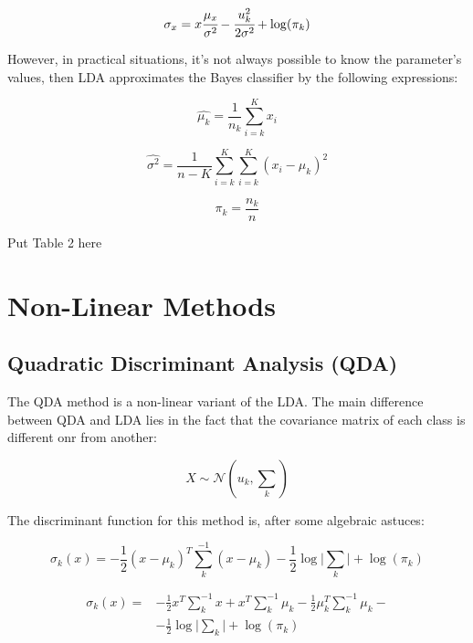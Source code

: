 \documentclass[conference]{IEEEtran}
\newcommand{\reviewUrgent}[1]{{\color{red} #1}} %
\begin{document}
\begin{equation}
    \sigma_x = x\cfrac{\mu_x}{\sigma^2} - \cfrac{u_k^2}{2\sigma^2} + \log(\pi_k) \label{eq9}
\end{equation}

However, in practical situations, it's not always possible to know the parameter's values,
then LDA approximates the Bayes classifier by the following expressions:

\begin{equation}
    \hat{\mu_k} = \frac{1}{n_k} \sum^K_{i = k} x_i \label{eq10}
\end{equation}

\begin{equation}
    \hat{\sigma^2} = \frac{1}{n-K} \sum^K_{i = k} \sum^K_{i = k} (x_i-\hat{\mu_k})^2 \label{eq11}
\end{equation}

\begin{equation}
    \pi_k = \frac{n_k}{n}\label{eq12}
\end{equation}


\reviewUrgent{Put Table 2 here}


\section{Non-Linear Methods}

\subsection{Quadratic Discriminant Analysis (QDA)}

The QDA method is a non-linear variant of the LDA. The main difference between QDA and LDA
lies in the fact that the covariance matrix of each class is different onr from another:

\begin{equation}
    X \sim  \mathcal{N}(u_k, \textstyle \sum_k)\label{eq13}
\end{equation}

The discriminant function for this method is, after some algebraic astuces:

\begin{equation}
    \sigma_k(x) = -\frac{1}{2}(x-\mu_k)^T\sum^{-1}_k(x-\mu_k) - \frac{1}{2}\log \lvert\sum_k\rvert +\log(\pi_k) \label{eq14}
\end{equation}

\begin{equation}
\begin{aligned}
    \sigma_k(x) = {} 
    & -\frac{1}{2}x^T\sum^{-1}_kx + x^T\sum^{-1}_k\mu_k -  \frac{1}{2}\mu_k^T\sum^{-1}_k\mu_k - \\ 
    & - \frac{1}{2}\log \lvert\sum_k\rvert +\log(\pi_k) \label{eq15}
\end{aligned}
\end{equation}
\end{document}
